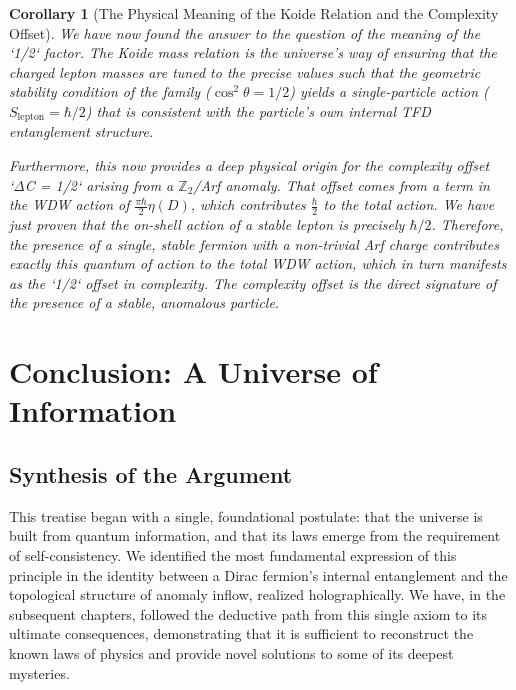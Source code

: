 \documentclass[11pt, letterpaper]{report}
\theoremstyle{plain} %
\newtheorem{corollary}[theorem]{Corollary}
\theoremstyle{definition} %
\theoremstyle{remark} %
\newcommand{\Ztwo}{\mathbb{Z}_2} %
\begin{document}
\begin{corollary}[The Physical Meaning of the Koide Relation and the Complexity Offset]
We have now found the answer to the question of the meaning of the `1/2` factor. The Koide mass relation is the universe's way of ensuring that the charged lepton masses are tuned to the precise values such that the geometric stability condition of the family ($\cos^2\theta = 1/2$) yields a single-particle action ($S_{\text{lepton}} = \hbar/2$) that is consistent with the particle's own internal TFD entanglement structure.

Furthermore, this now provides a deep physical origin for the complexity offset `ΔC = 1/2` arising from a $\Ztwo$/Arf anomaly. That offset comes from a term in the WDW action of $\frac{\pi\hbar}{2}\eta(D)$, which contributes $\frac{\hbar}{2}$ to the total action. We have just proven that the on-shell action of a stable lepton is precisely $\hbar/2$. Therefore, the presence of a single, stable fermion with a non-trivial Arf charge contributes exactly this quantum of action to the total WDW action, which in turn manifests as the `1/2` offset in complexity. The complexity offset is the direct signature of the presence of a stable, anomalous particle.
\end{corollary}







\chapter{Conclusion: A Universe of Information}
\label{chap:conclusion}

\section{Synthesis of the Argument}

This treatise began with a single, foundational postulate: that the universe is built from quantum information, and that its laws emerge from the requirement of self-consistency. We identified the most fundamental expression of this principle in the identity between a Dirac fermion's internal entanglement and the topological structure of anomaly inflow, realized holographically. We have, in the subsequent chapters, followed the deductive path from this single axiom to its ultimate consequences, demonstrating that it is sufficient to reconstruct the known laws of physics and provide novel solutions to some of its deepest mysteries.
\end{document}
